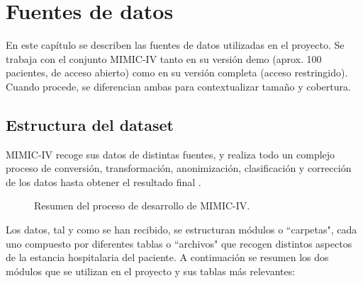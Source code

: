 \chapter{Fuentes de datos}

En este capítulo se describen las fuentes de datos utilizadas en el proyecto. Se trabaja con el conjunto MIMIC-IV tanto en su versión demo (aprox. 100 pacientes, de acceso abierto) como en su versión completa (acceso restringido). Cuando procede, se diferencian ambas para contextualizar tamaño y cobertura.

\section{Estructura del dataset}


MIMIC-IV recoge sus datos de distintas fuentes, y realiza todo un complejo proceso de conversión, transformación, anonimización, clasificación y corrección de los datos hasta obtener el resultado final \cite{MIMICIV_paper}.

\begin{figure}[H]
    \centering
    \caption{Resumen del proceso de desarrollo de MIMIC-IV. \cite{MIMICIV_paper}}
    \label{fig:desarrollo_mimiciv}
\end{figure}


Los datos, tal y como se han recibido, se estructuran módulos o ``carpetas", cada uno compuesto por diferentes tablas o ``archivos" que recogen distintos aspectos de la estancia hospitalaria del paciente. A continuación se resumen los dos módulos que se utilizan en el proyecto y sus tablas más relevantes:

